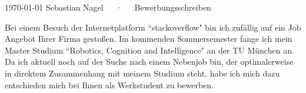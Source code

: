 \documentclass[12pt, a4paper]{awesome-cv}
\begin{document}
\makecvheader
\makecvfooter
  {\today}
  {Sebastian Nagel~~~·~~~Bewerbungsschreiben}
  {}

\medskip
\makelettertitle

%
%
\begin{cvletter}

Bei einem Besuch der Internetplatform ``stackoverflow" bin ich zufällig auf ein Job Angebot Ihrer Firma gestoßen. Im kommenden Sommersemester fange ich mein Master Studium ``Robotics, Cognition and Intelligence" an der TU München an. Da ich aktuell noch auf der Suche nach einem Nebenjob bin, der optimalerweise in direktem Zusammenhang mit meinem Studium steht, habe ich mich dazu entschieden mich bei Ihnen als Werkstudent zu bewerben.


\end{cvletter}
\end{document}
